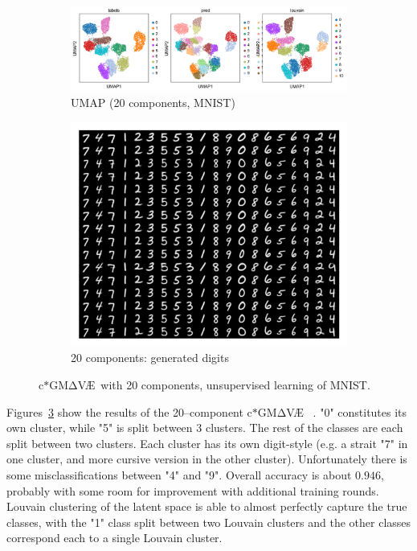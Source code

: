 \documentclass[11pt, a4paper]{report}
\theoremstyle{plain}
\theoremstyle{definition}
\theoremstyle{remark}
\newcommand{\gmvae}{c$\ast$GM$\mathrm{\Delta}$V\AE~}
\begin{document}
\begin{figure}[h]
\centering
\begin{subfigure}[b]{1.01\textwidth}
\includegraphics[width=\textwidth]{images/gmmvae_mnist_us_20c_umap4.png}
\caption{UMAP (20 components, MNIST)}
\label{fig:mnist_us_20c_latent}
\end{subfigure}
\begin{subfigure}[b]{0.5\textwidth}
\includegraphics[width=\textwidth]{images/gmmvae_mnist_us_20c_samples4.png}
\caption{20 components: generated digits}
\label{fig:mnist_us_20c_samples}
\end{subfigure}
\caption{\gmvae with 20 components, unsupervised learning of MNIST.}
\label{fig:mnist_us_20}
\end{figure}

Figures~\ref{fig:mnist_us_20} show the results of the 20--component \gmvae
. "0" constitutes its own cluster, while "5" is split between 3 clusters.
The rest of the classes are each split between two clusters. Each cluster has
its own digit-style (e.g. a strait "7" in one cluster, and more cursive version
in the other cluster). Unfortunately there is some misclassifications between
"4" and "9". Overall accuracy is about $0.946$, probably with some room for
improvement with additional training rounds. Louvain clustering of the latent
space is able to almost perfectly capture the true classes, with the "1" class
split between two Louvain clusters and the other classes correspond each to a
single Louvain cluster.
\end{document}
